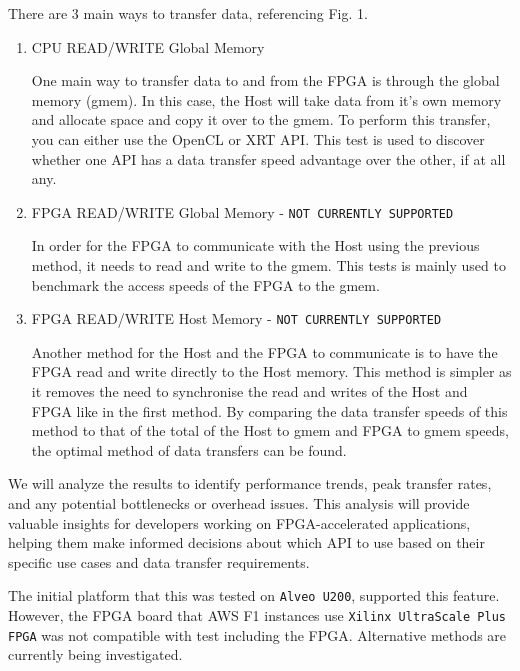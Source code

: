 There are 3 main ways to transfer data, referencing Fig. 1. 
\begin{enumerate}
    \item CPU READ/WRITE Global Memory

    One main way to transfer data to and from the FPGA is through the global memory (gmem). In this case, the Host will take data from it's own memory and allocate space and copy it over to the gmem. To perform this transfer, you can either use the OpenCL or XRT API. This test is used to discover whether one API has a data transfer speed advantage over the other, if at all any.

    \item FPGA READ/WRITE Global Memory - \texttt{NOT CURRENTLY SUPPORTED}

    In order for the FPGA to communicate with the Host using the previous method, it needs to read and write to the gmem. This tests is mainly used to benchmark the access speeds of the FPGA to the gmem.
    
    \item FPGA READ/WRITE Host Memory - \texttt{NOT CURRENTLY SUPPORTED}

    Another method for the Host and the FPGA to communicate is to have the FPGA read and write directly to the Host memory. This method is simpler as it removes the need to synchronise the read and writes of the Host and FPGA like in the first method. By comparing the data transfer speeds of this method to that of the total of the Host to gmem and FPGA to gmem speeds, the optimal method of data transfers can be found. \\
\end{enumerate}

We will analyze the results to identify performance trends, peak transfer rates, and any potential bottlenecks or overhead issues. This analysis will provide valuable insights for developers working on FPGA-accelerated applications, helping them make informed decisions about which API to use based on their specific use cases and data transfer requirements.

The initial platform that this was tested on \texttt{Alveo U200}, supported this feature. However, the FPGA board that AWS F1 instances use \texttt{Xilinx UltraScale Plus FPGA} was not compatible with test including the FPGA. Alternative methods are currently being investigated. \\